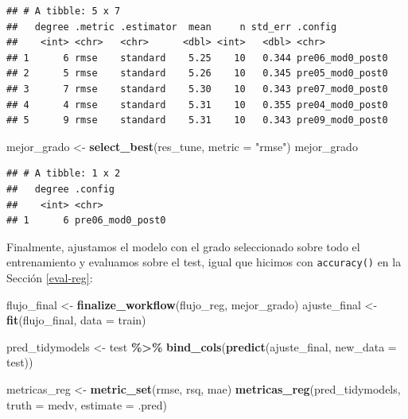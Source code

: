 \documentclass[
]{book}
\newenvironment{Shaded}{\begin{snugshade}}{\end{snugshade}}
\newcommand{\AttributeTok}[1]{\textcolor[rgb]{0.13,0.29,0.53}{#1}}
\newcommand{\FunctionTok}[1]{\textcolor[rgb]{0.13,0.29,0.53}{\textbf{#1}}}
\newcommand{\NormalTok}[1]{#1}
\newcommand{\OtherTok}[1]{\textcolor[rgb]{0.56,0.35,0.01}{#1}}
\newcommand{\SpecialCharTok}[1]{\textcolor[rgb]{0.81,0.36,0.00}{\textbf{#1}}}
\newcommand{\StringTok}[1]{\textcolor[rgb]{0.31,0.60,0.02}{#1}}
\theoremstyle{break}
\theoremstyle{nonumberplain}
\begin{document}
\begin{verbatim}
## # A tibble: 5 x 7
##   degree .metric .estimator  mean     n std_err .config         
##    <int> <chr>   <chr>      <dbl> <int>   <dbl> <chr>           
## 1      6 rmse    standard    5.25    10   0.344 pre06_mod0_post0
## 2      5 rmse    standard    5.26    10   0.345 pre05_mod0_post0
## 3      7 rmse    standard    5.30    10   0.343 pre07_mod0_post0
## 4      4 rmse    standard    5.31    10   0.355 pre04_mod0_post0
## 5      9 rmse    standard    5.31    10   0.343 pre09_mod0_post0
\end{verbatim}

\begin{Shaded}
\begin{Highlighting}[]
\NormalTok{mejor\_grado }\OtherTok{\textless{}{-}} \FunctionTok{select\_best}\NormalTok{(res\_tune, }\AttributeTok{metric =} \StringTok{"rmse"}\NormalTok{)}
\NormalTok{mejor\_grado}
\end{Highlighting}
\end{Shaded}

\begin{verbatim}
## # A tibble: 1 x 2
##   degree .config         
##    <int> <chr>           
## 1      6 pre06_mod0_post0
\end{verbatim}

Finalmente, ajustamos el modelo con el grado seleccionado sobre todo el entrenamiento y evaluamos sobre el test, igual que hicimos con \texttt{accuracy()} en la Sección \ref{eval-reg}:

\begin{Shaded}
\begin{Highlighting}[]
\NormalTok{flujo\_final }\OtherTok{\textless{}{-}} \FunctionTok{finalize\_workflow}\NormalTok{(flujo\_reg, mejor\_grado)}
\NormalTok{ajuste\_final }\OtherTok{\textless{}{-}} \FunctionTok{fit}\NormalTok{(flujo\_final, }\AttributeTok{data =}\NormalTok{ train)}

\NormalTok{pred\_tidymodels }\OtherTok{\textless{}{-}}\NormalTok{ test }\SpecialCharTok{\%\textgreater{}\%}
  \FunctionTok{bind\_cols}\NormalTok{(}\FunctionTok{predict}\NormalTok{(ajuste\_final, }\AttributeTok{new\_data =}\NormalTok{ test))}

\NormalTok{metricas\_reg }\OtherTok{\textless{}{-}} \FunctionTok{metric\_set}\NormalTok{(rmse, rsq, mae)}
\FunctionTok{metricas\_reg}\NormalTok{(pred\_tidymodels, }\AttributeTok{truth =}\NormalTok{ medv, }\AttributeTok{estimate =}\NormalTok{ .pred)}
\end{Highlighting}
\end{Shaded}
\end{document}
